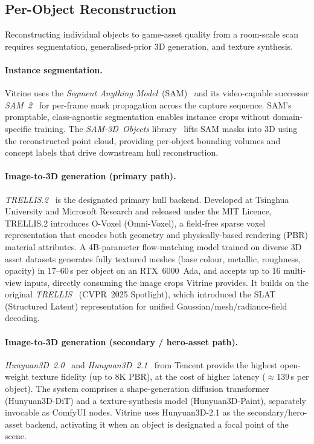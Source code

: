 \subsection{Per-Object Reconstruction}
\label{sec:tech:objects}

Reconstructing individual objects to game-asset quality from a room-scale scan
requires segmentation, generalised-prior 3D generation, and texture synthesis.

\paragraph{Instance segmentation.}
Vitrine uses the \emph{Segment Anything Model}~(SAM)~\cite{kirillov2023_sam} and
its video-capable successor \emph{SAM~2}~\cite{ravi2024_sam2} for per-frame mask
propagation across the capture sequence.  SAM's promptable, class-agnostic
segmentation enables instance crops without domain-specific training.  The
\emph{SAM-3D~Objects} library~\cite{sam3dobjects2025} lifts SAM masks into 3D using
the reconstructed point cloud, providing per-object bounding volumes and concept
labels that drive downstream hull reconstruction.

\paragraph{Image-to-3D generation (primary path).}
\emph{TRELLIS.2}~\cite{xiang2025_trellis2} is the designated primary hull backend.
Developed at Tsinghua University and Microsoft Research and released under the MIT
Licence, TRELLIS.2 introduces O-Voxel (Omni-Voxel), a field-free sparse voxel
representation that encodes both geometry and physically-based rendering (PBR)
material attributes.  A 4B-parameter flow-matching model trained on diverse 3D asset
datasets generates fully textured meshes (base colour, metallic, roughness, opacity)
in 17--60\,s per object on an RTX~6000~Ada, and accepts up to 16 multi-view inputs,
directly consuming the image crops Vitrine provides.  It builds on the original
\emph{TRELLIS}~\cite{xiang2024_trellis} (CVPR~2025 Spotlight), which introduced the
SLAT (Structured Latent) representation for unified Gaussian/mesh/radiance-field
decoding.

\paragraph{Image-to-3D generation (secondary / hero-asset path).}
\emph{Hunyuan3D~2.0}~\cite{zhao2025_hunyuan3d20} and
\emph{Hunyuan3D~2.1}~\cite{hunyuan2025_21} from Tencent provide the highest
open-weight texture fidelity (up to 8K PBR), at the cost of higher latency
($\approx$139\,s per object).  The system comprises a shape-generation diffusion
transformer (Hunyuan3D-DiT) and a texture-synthesis model (Hunyuan3D-Paint),
separately invocable as ComfyUI nodes.  Vitrine uses Hunyuan3D-2.1 as the
secondary/hero-asset backend, activating it when an object is designated a focal
point of the scene.

